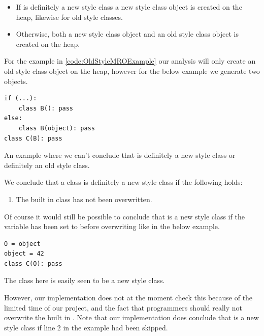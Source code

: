 \begin{itemize}
	\item If  is definitely a new style class a new style class object is created on the heap, likewise for old style classes.
	\item Otherwise, both a new style class object and an old style class object is created on the heap.
\end{itemize}

For the example in \autoref{code:OldStyleMROExample} our analysis will only create an old style class object on the heap, however for the below example we generate two objects.

\begin{listing}[H]
	\begin{verbatim}
if (...):
	class B(): pass
else:
	class B(object): pass
class C(B): pass
	\end{verbatim}
	\caption{An example where we can't conclude that  is definitely a new style class or definitely an old style class.}\label{code:NotDefinatelyNewOldStyleClass}
\end{listing}

We conclude that a class is definitely a new style class if the following holds:

\begin{enumerate}
	\item The built in class  has not been overwritten.
\end{enumerate}

Of course it would still be possible to conclude that  is a new style class if the variable  has been set to  before overwriting  like in the below example.

\begin{listing}[H]
	\begin{verbatim}
O = object
object = 42
class C(O): pass
	\end{verbatim}
	\caption{The class  here is easily seen to be a new style class.}\label{code:ClassOverwrittenObject}
\end{listing}

However, our implementation does not at the moment check this because of the limited time of our project, and the fact that programmers should really not overwrite the built in . Note that our implementation does conclude that  is a new style class if line 2 in the example had been skipped.

